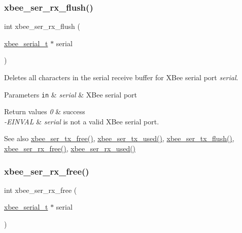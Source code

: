 \subsubsection{\texorpdfstring{xbee\+\_\+ser\+\_\+rx\+\_\+flush()}{xbee\_ser\_rx\_flush()}}
{\footnotesize\ttfamily int xbee\+\_\+ser\+\_\+rx\+\_\+flush (\begin{DoxyParamCaption}\item[{\hyperlink{structxbee__serial__t}{xbee\+\_\+serial\+\_\+t} $\ast$}]{serial }\end{DoxyParamCaption})}



Deletes all characters in the serial receive buffer for X\+Bee serial port {\itshape serial}. 


\begin{DoxyParams}[1]{Parameters}
\mbox{\tt in}  & {\em serial} & X\+Bee serial port\\
\hline
\end{DoxyParams}

\begin{DoxyRetVals}{Return values}
{\em 0} & success \\
\hline
{\em -\/\+E\+I\+N\+V\+AL} & {\itshape serial} is not a valid X\+Bee serial port.\\
\hline
\end{DoxyRetVals}
\begin{DoxySeeAlso}{See also}
\hyperlink{group__xbee__serial_ga3ad8f378b572d6fec982f1086bd3b94f}{xbee\+\_\+ser\+\_\+tx\+\_\+free()}, \hyperlink{group__xbee__serial_gaabf70934d186354cde4ac14ed27d1bd2}{xbee\+\_\+ser\+\_\+tx\+\_\+used()}, \hyperlink{group__xbee__serial_ga05308d37301d27715f1e1308b7189220}{xbee\+\_\+ser\+\_\+tx\+\_\+flush()}, \hyperlink{group__xbee__serial_ga16fb431a1e66861439518e562431821f}{xbee\+\_\+ser\+\_\+rx\+\_\+free()}, \hyperlink{group__xbee__serial_ga43b8322771cc16b4130fa5330ad2242b}{xbee\+\_\+ser\+\_\+rx\+\_\+used()} 
\end{DoxySeeAlso}
\mbox{\label{group__hal__kl25_ga16fb431a1e66861439518e562431821f}} 
\subsubsection{\texorpdfstring{xbee\+\_\+ser\+\_\+rx\+\_\+free()}{xbee\_ser\_rx\_free()}}
{\footnotesize\ttfamily int xbee\+\_\+ser\+\_\+rx\+\_\+free (\begin{DoxyParamCaption}\item[{\hyperlink{structxbee__serial__t}{xbee\+\_\+serial\+\_\+t} $\ast$}]{serial }\end{DoxyParamCaption})}




